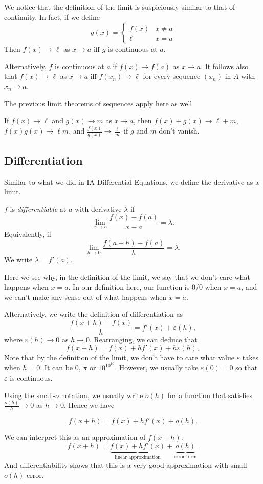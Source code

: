 \documentclass[a4paper]{article}
\begin{document}
We notice that the definition of the limit is suspiciously similar to that of continuity. In fact, if we define
\[
  g(x) =
  \begin{cases}
    f(x) & x \not =a\\
    \ell & x = a
  \end{cases}
\]
Then $f(x) \to \ell$ as $x \to a$ iff $g$ is continuous at $a$.

Alternatively, $f$ is continuous at $a$ if $f(x) \to f(a)$ as $x \to a$. It follows also that $f(x) \to \ell$ as $x\to a$ iff $f(x_n) \to \ell$ for every sequence $(x_n)$ in $A$ with $x_n\to a$.

The previous limit theorems of sequences apply here as well
\begin{prop}
  If $f(x)\to \ell$ and $g(x)\to m$ as $x\to a$, then $f(x) + g(x) \to \ell+ m$, $f(x)g(x) \to \ell m$, and $\frac{f(x)}{g(x)}\to \frac{\ell}{m}$ if $g$ and $m$ don't vanish.
\end{prop}

\subsection{Differentiation}
Similar to what we did in IA Differential Equations, we define the derivative as a limit.
\begin{defi}
  $f$ is \emph{differentiable} at $a$ with derivative $\lambda$ if
  \[
    \lim_{x\to a}\frac{f(x) - f(a)}{x - a} = \lambda.
  \]
  Equivalently, if
  \[
    \lim_{h\to 0}\frac{f(a + h) - f(a)}{h} = \lambda.
  \]
  We write $\lambda = f'(a)$.
\end{defi}
Here we see why, in the definition of the limit, we say that we don't care what happens when $x = a$. In our definition here, our function is 0/0 when $x = a$, and we can't make any sense out of what happens when $x = a$.

Alternatively, we write the definition of differentiation as
\[
  \frac{f(x + h) - f(x)}{h} = f'(x) + \varepsilon(h),
\]
where $\varepsilon(h) \to 0$ as $h \to 0$. Rearranging, we can deduce that
\[
  f(x + h) = f(x) + hf'(x) + h\varepsilon(h),
\]
Note that by the definition of the limit, we don't have to care what value $\varepsilon$ takes when $h = 0$. It can be $0$, $\pi$ or $10^{10^{10}}$. However, we usually take $\varepsilon(0) = 0$ so that $\varepsilon$ is continuous.

Using the small-$o$ notation, we usually write $o(h)$ for a function that satisfies $\frac{o(h)}{h}\to 0$ as $h\to 0$. Hence we have
\begin{prop}
  \[
    f(x + h) = f(x) + hf'(x) + o(h).
  \]
\end{prop}
We can interpret this as an approximation of $f(x + h)$:
\[
  f(x + h) = \underbrace{f(x) + hf'(x)}_{\text{linear approximation}} + \underbrace{o(h)}_{\text{error term}}.
\]
And differentiability shows that this is a very good approximation with small $o(h)$ error.
\end{document}
